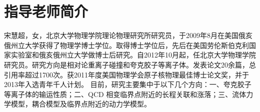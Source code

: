 \documentclass[aps,pre,12pt,preprint,onecolumn,showpacs,showkeys]{revtex4-1}
\begin{document}
\section{\heiti{}指导老师简介}
宋慧超，女，北京大学物理学院理论物理研究所研究员，于2009年8月在美国俄亥俄州立大学获得了物理学博士学位。取得博士学位后，先后在美国劳伦斯伯克利国家实验室和俄亥俄州立大学做博士后研究。自2012年10月起，任北京大学物理学院研究员。研究方向是相对论重离子碰撞和夸克胶子等离子体。发表论文20余篇，总引用率超过1700次。获2011年度美国物理学会原子核物理最佳博士论文奖，并于2013年入选青年千人计划。
目前，研究主要集中于以下几个方向：一、夸克胶子等离子体的输运性质；二、QCD 相变临界点附近的长程关联和涨落；三、流体力学模型，耦合模型及临界点附近的动力学模型。
\end{document}
